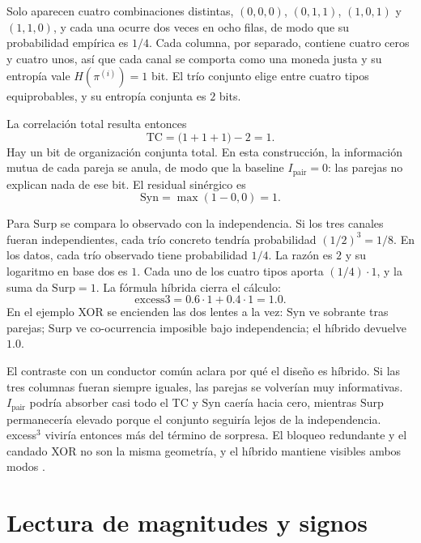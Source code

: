 \documentclass[11pt,a4paper]{article}
\begin{document}
Solo aparecen cuatro combinaciones distintas,
$(0,0,0)$, $(0,1,1)$, $(1,0,1)$ y $(1,1,0)$, y cada una ocurre dos veces en
ocho filas, de modo que su probabilidad emp\'irica es $1/4$. Cada columna,
por separado, contiene cuatro ceros y cuatro unos, as\'i que cada canal se
comporta como una moneda justa y su entrop\'ia vale $H(\pi^{(i)})=1$ bit. El
tr\'io conjunto elige entre cuatro tipos equiprobables, y su entrop\'ia
conjunta es $2$ bits.

La correlaci\'on total resulta entonces
\begin{equation*}
\mathrm{TC}
=
\bigl(1+1+1\bigr)-2
=
1.
\end{equation*}
Hay un bit de organizaci\'on conjunta total. En esta construcci\'on, la
informaci\'on mutua de cada pareja se anula, de modo que la baseline
$I_{\mathrm{pair}}=0$: las parejas no explican nada de ese bit. El residual
sin\'ergico es
\begin{equation*}
\mathrm{Syn}
=
\max(1-0,0)
=
1.
\end{equation*}

Para $\mathrm{Surp}$ se compara lo observado con la independencia. Si los
tres canales fueran independientes, cada tr\'io concreto tendr\'ia
probabilidad $(1/2)^3=1/8$. En los datos, cada tr\'io observado tiene
probabilidad $1/4$. La raz\'on es $2$ y su logaritmo en base dos es $1$.
Cada uno de los cuatro tipos aporta $(1/4)\cdot 1$, y la suma da
$\mathrm{Surp}=1$. La f\'ormula h\'ibrida cierra el c\'alculo:
\begin{equation*}
\mathrm{excess3}
=
0.6\cdot 1 + 0.4\cdot 1
=
1.0.
\end{equation*}
En el ejemplo XOR se encienden las dos lentes a la vez: $\mathrm{Syn}$ ve
sobrante tras parejas; $\mathrm{Surp}$ ve co-ocurrencia imposible bajo
independencia; el h\'ibrido devuelve $1.0$.

El contraste con un conductor com\'un aclara por qu\'e el dise\~no es
h\'ibrido. Si las tres columnas fueran siempre iguales, las parejas se
volver\'ian muy informativas. $I_{\mathrm{pair}}$ podr\'ia absorber casi todo
el TC y $\mathrm{Syn}$ caer\'ia hacia cero, mientras $\mathrm{Surp}$
permanecer\'ia elevado porque el conjunto seguir\'ia lejos de la
independencia. excess$^3$ vivir\'ia entonces m\'as del t\'ermino de sorpresa.
El bloqueo redundante y el candado XOR no son la misma geometr\'ia, y el
h\'ibrido mantiene visibles ambos modos \citep{Padilla2026excess3}.

\section{Lectura de magnitudes y signos}
\label{sec:leer}
\end{document}
